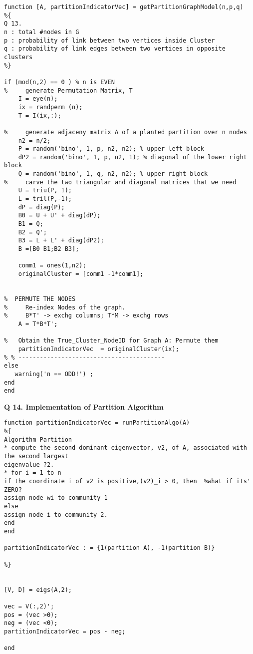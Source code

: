 \documentclass[9pt]{article}
\begin{document}
\begin{lstlisting}
function [A, partitionIndicatorVec] = getPartitionGraphModel(n,p,q)
%{ 
Q 13.
n : total #nodes in G
p : probability of link between two vertices inside Cluster
q : probability of link edges between two vertices in opposite clusters
%}

if (mod(n,2) == 0 ) % n is EVEN
%     generate Permutation Matrix, T
    I = eye(n);
    ix = randperm (n);
    T = I(ix,:);

%     generate adjaceny matrix A of a planted partition over n nodes
    n2 = n/2;
    P = random('bino', 1, p, n2, n2); % upper left block
    dP2 = random('bino', 1, p, n2, 1); % diagonal of the lower right block
    Q = random('bino', 1, q, n2, n2); % upper right block
%     carve the two triangular and diagonal matrices that we need
    U = triu(P, 1);
    L = tril(P,-1);
    dP = diag(P);
    B0 = U + U' + diag(dP);
    B1 = Q;
    B2 = Q';
    B3 = L + L' + diag(dP2);
    B =[B0 B1;B2 B3];

    comm1 = ones(1,n2);
    originalCluster = [comm1 -1*comm1];
    

%  PERMUTE THE NODES
%     Re-index Nodes of the graph. 
%     B*T' -> exchg columns; T*M -> exchg rows
    A = T*B*T'; 

%   Obtain the True_Cluster_NodeID for Graph A: Permute them
    partitionIndicatorVec  = originalCluster(ix);
% % -----------------------------------------
else
   warning('n == ODD!') ;
end
end

\end{lstlisting}

\hrulefill



\textbf{Q 14.  Implementation of Partition Algorithm}
\begin{lstlisting}
function partitionIndicatorVec = runPartitionAlgo(A)
%{ 
Algorithm Partition
* compute the second dominant eigenvector, v2, of A, associated with the second largest
eigenvalue ?2.
* for i = 1 to n
if the coordinate i of v2 is positive,(v2)_i > 0, then  %what if its' ZERO?
assign node wi to community 1
else
assign node i to community 2.
end
end

partitionIndicatorVec : = {1(partition A), -1(partition B)}

%}


[V, D] = eigs(A,2);

vec = V(:,2)';
pos = (vec >0);
neg = (vec <0);
partitionIndicatorVec = pos - neg;

end
\end{lstlisting}
\hrulefill
\end{document}
